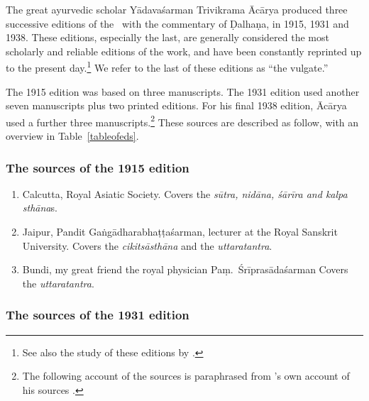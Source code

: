 The great ayurvedic scholar Yādavaśarman Trivikrama Ācārya produced three 
successive editions of the
\SS\ with the commentary of Ḍalhaṇa, in 1915, 1931 and 1938.  These
editions, especially the last, are generally considered the most 
scholarly
and reliable editions of the work, and have been constantly reprinted up
to the present day.\footnote{See also the study of these editions by \textcites[\S 
1.2]{kleb-2021b}[143--144]{wuja-2013}.}  We refer to the last of these editions 
as “the vulgate.”

The 1915 edition was based on three manuscripts.  The 1931 edition used another
seven manuscripts plus two printed editions.  For his final 1938 edition, Ācārya
used a further three manuscripts.\footnote{The following account of the sources is
paraphrased from \citeauthor{vulgate}'s own account of his sources
\citep[22]{vulgate}.}  These sources are described as follow, with an overview in
Table~\ref{tableofeds}.

\subsubsection{The sources of the 1915 edition}

\begin{enumerate}
    \item[1] Calcutta, Royal Asiatic Society.  Covers the \emph{sūtra, nidāna, śārīra 
    and 
        kalpa sthāna}s.  
    
    \item [2] Jaipur, Pandit Gaṅgādharabhaṭṭaśarman, lecturer at the Royal 
    Sanskrit University.  Covers the \emph{cikitsāsthāna} and the 
    \emph{uttaratantra}.
    
    \item [3]  Bundi, my great friend the royal physician Paṃ.\ Śrīprasādaśarman  
    Covers the \emph{uttaratantra}.
\end{enumerate}

\subsubsection{The sources of the 1931 edition}


